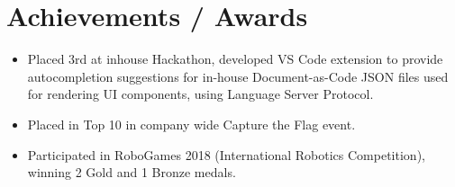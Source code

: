 \documentclass[letterpaper,11pt]{article}
\newcommand{\resumeItem}[1]{
  \item\small{
    {#1 \vspace{-2pt}}
  }
}
\newcommand{\resumeItemListStart}{\begin{itemize}}
\newcommand{\resumeItemListEnd}{\end{itemize}\vspace{-5pt}}
\begin{document}
\section{Achievements / Awards}
	\resumeItemListStart
		\resumeItem{Placed 3rd at inhouse Hackathon, developed VS Code extension to provide autocompletion suggestions for in-house Document-as-Code JSON files used for rendering UI components, using Language Server Protocol.}
		\resumeItem{Placed in Top 10 in company wide Capture the Flag event.}
		\resumeItem{Participated in RoboGames 2018 (International Robotics Competition), winning 2 Gold and 1 Bronze medals.}
	\resumeItemListEnd
\end{document}
